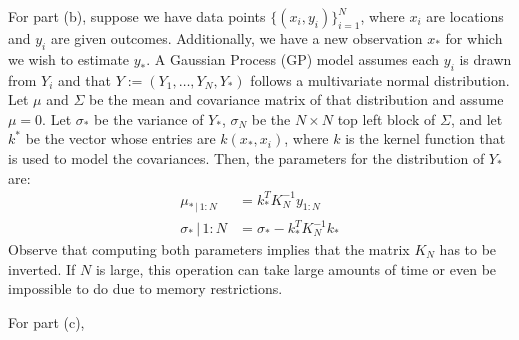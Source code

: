 \documentclass[11pt, english]{article}
\begin{document}
\begin{multicols}{2}
For part (b), suppose we have data points $\{(x_{i}, y_{i})\}_{i=1}^{N}$, where $x_{i}$ are locations and $y_{i}$ are given outcomes. Additionally, we have a new observation $x_{*}$ for which we wish to estimate $y_{*}$. A Gaussian Process (GP) model assumes each $y_{i}$ is drawn from $Y_{i}$ and that $Y := (Y_{1}, \ldots, Y_{N}, Y_{*})$ follows a multivariate normal distribution. Let $\mu$ and $\Sigma$ be the mean and covariance matrix of that distribution and assume $\mu = 0$. Let $\sigma_{*}$ be the variance of $Y_{*}$, $\sigma_{N}$ be the $N \times N$ top left block of $\Sigma$, and let $k^{*}$ be the vector whose entries are $k(x_{*}, x_{i})$, where $k$ is the kernel function that is used to model the covariances. Then, the parameters for the distribution of $Y_{*}$ are:
	\begin{align*}
		\mu_{*\,|\,1:N}		&=	k_{*}^{T}K_{N}^{-1}y_{1:N}	\\
		\sigma_{*}\,|\,1:N	&=	\sigma_{*} - k_{*}^{T}K_{N}^{-1}k_{*}
	\end{align*}
Observe that computing both parameters implies that the matrix $K_{N}$ has to be inverted. If $N$ is large, this operation can take large amounts of time or even be impossible to do due to memory restrictions.


For part (c), 




\end{multicols}
\end{document}
